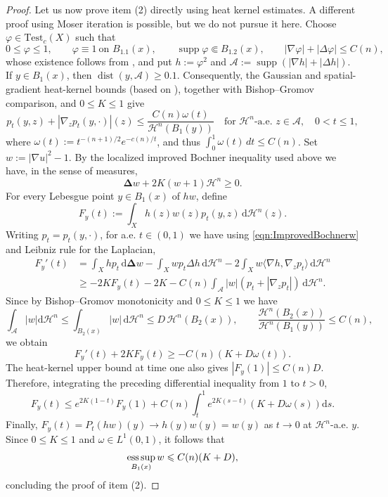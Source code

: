 \documentclass[12pt,a4paper,reqno]{amsart}
\renewcommand{\leq}{\leqslant}
\renewcommand{\geq}{\geqslant}
\renewcommand{\d}{\ensuremath{\mathrm d}}
\newcommand{\Hn}{\mathcal H^n}
\newcommand{\supp}{\operatorname{supp}}
\newcommand{\dist}{\operatorname{dist}}
\begin{document}
\begin{proof}
Let us now prove item (2) directly using heat kernel estimates. A different proof using Moser iteration is possible, but we do not pursue it here. Choose $\varphi\in\mathrm{Test}_{c}(X)$ such that
\[
 0\leq\varphi\leq1,\qquad
 \varphi\equiv1\ \text{on }B_{1.1}(x),\qquad
 \supp\varphi\Subset B_{1.2}(x),\qquad
 |\nabla\varphi|+|\Delta\varphi|\leq C(n),
\]
whose existence follows from \cite[Lemma 3.1]{MondinoNaber}, and put $h:=\varphi^2$ and $\mathcal A:=\supp(|\nabla h|+|\Delta h|)$. If $y\in B_{1}(x)$, then $\dist(y,\mathcal A)\geq 0.1$. Consequently, the Gaussian and spatial-gradient heat-kernel bounds \cite[(2.12)]{GigliViolo} (based on
\cite[Theorem 1.2 and Corollary 1.2]{JiangLiZhang}), together with Bishop--Gromov comparison, and $0\leq K\leq 1$ give
\[
 p_t(y,z)+|\nabla_zp_t(y,\cdot)|(z)
 \leq\frac{C(n)\omega(t)}{\Hn(B_1(y))}
 \quad\text{for $\Hn$-a.e. }z\in\mathcal A,\quad 0<t\leq1,
\]
where $\omega(t):=t^{-(n+1)/2}e^{-c(n)/t}$, and thus $\int_0^1\omega(t)\,dt\leq C(n)$. Set $w:=|\nabla u|^2-1$. By the localized improved Bochner inequality used above we have, in the sense of measures,
\begin{equation}\label{eqn:ImprovedBochnerw}
\mathbf{\Delta}w +2K(w+1)\mathcal{H}^n\geq 0.
\end{equation}
For every Lebesgue point $y\in B_{1}(x)$ of $h w$, define
\[
 F_y(t):=\int_X h(z)w(z)p_t(y,z)\,\mathrm{d}\Hn(z).
\]
Writing $p_t=p_t(y,\cdot)$, for a.e. $t\in(0,1)$ we have using \eqref{eqn:ImprovedBochnerw} and Leibniz rule for the Laplacian,
\[
 \begin{aligned}
 F_y'(t)
 &=\int_X hp_t\,\mathrm{d}\mathbf{\Delta}w
   -\int_Xwp_t\Delta h\,\mathrm{d}\Hn
   -2\int_Xw\langle\nabla h,\nabla_zp_t\rangle\,\mathrm{d}\Hn\\
 &\geq-2K F_y(t)-2K
   -C(n)\int_{\mathcal A}|w|
          \left(p_t+|\nabla_zp_t|\right)\,\mathrm{d}\Hn.
 \end{aligned}
\]
Since by Bishop--Gromov monotonicity and $0\leq K\leq 1$ we have
\[
\int_{\mathcal{A}}|w|\d\mathcal{H}^n\leq \int_{B_{2}(x)}|w|\,\mathrm{d}\Hn
 \leq D\,\Hn(B_{2}(x)),
 \qquad
 \frac{\Hn(B_{2}(x))}{\Hn(B_1(y))}\leq C(n),
\]
we obtain
\[
 F_y'(t)+2K F_y(t)
 \geq-C(n)\left(K+D\omega(t)\right).
\]
The heat-kernel upper bound at time one also gives $|F_y(1)|\leq C(n) D$. Therefore, integrating the preceding differential inequality from $1$ to $t>0$,
\[
 F_y(t)\leq e^{2 K(1-t)}F_y(1)
 +C(n)\int_t^1e^{2K(s-t)}
                 \left(K+D\omega(s)\right)\mathrm{d}s.
\]
Finally, $F_y(t)=P_t(hw)(y)\to h(y)w(y)=w(y)$ as $t\to 0$ at $\Hn$-a.e.\! $y$. Since $0\leq K\leq1$ and $\omega\in L^1(0,1)$, it follows that
\[
 \mathop{\rm ess\,sup}_{B_{1}(x)}w
 \leq C(n)(K+D),
\]
concluding the proof of item (2).
\end{proof}
\end{document}
